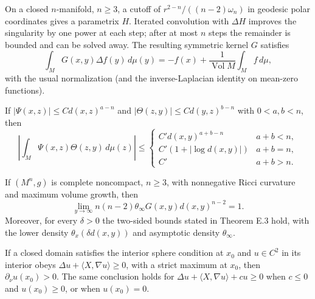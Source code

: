 \begin{theorem}
\label{thm:chow-ii-closed-manifold-green-function}
On a closed $n$-manifold, $n\ge3$, a cutoff of
$r^{2-n}/((n-2)\omega_n)$ in geodesic polar coordinates gives a parametrix
$H$.  Iterated convolution with $\Delta H$ improves the singularity by one
power at each step; after at most $n$ steps the remainder is bounded and can
be solved away.  The resulting symmetric kernel $G$ satisfies
\[
\int_M G(x,y)\Delta f(y)\,d\mu(y)=-f(x)+\frac1{\operatorname{Vol}M}\int_M f\,d\mu,
\]
with the usual normalization (and the inverse-Laplacian identity on mean-zero
functions).
\end{theorem}

\begin{lemma}
\label{lem:chow-ii-green-convolution-estimate}
If $|\Psi(x,z)|\le C d(x,z)^{a-n}$ and
$|\Theta(z,y)|\le C d(y,z)^{b-n}$ with $0<a,b<n$, then
\[
\left|\int_M\Psi(x,z)\Theta(z,y)\,d\mu(z)\right|
\le\begin{cases}C'd(x,y)^{a+b-n}&a+b<n,\\
C'(1+|\log d(x,y)|)&a+b=n,\\ C'&a+b>n.
\end{cases}
\]
\end{lemma}

\begin{theorem}
\label{thm:chow-ii-green-asymptotics}
If $(M^n,g)$ is complete noncompact, $n\ge3$, with nonnegative Ricci
curvature and maximum volume growth, then
\[
\lim_{y\to\infty}n(n-2)\theta_\infty G(x,y)d(x,y)^{n-2}=1.
\]
Moreover, for every $\delta>0$ the two-sided bounds stated in Theorem E.3
hold, with the lower density $\theta_x(\delta d(x,y))$ and asymptotic density
$\theta_\infty$.
\end{theorem}

\begin{theorem}
\label{thm:chow-ii-hopf-boundary-point}
If a closed domain satisfies the interior sphere condition at $x_0$ and
$u\in C^2$ in its interior obeys $\Delta u+\langle X,\nabla u\rangle\ge0$,
with a strict maximum at $x_0$, then $\partial_\nu u(x_0)>0$.  The same
conclusion holds for $\Delta u+\langle X,\nabla u\rangle+cu\ge0$ when
$c\le0$ and $u(x_0)\ge0$, or when $u(x_0)=0$.
\end{theorem}

